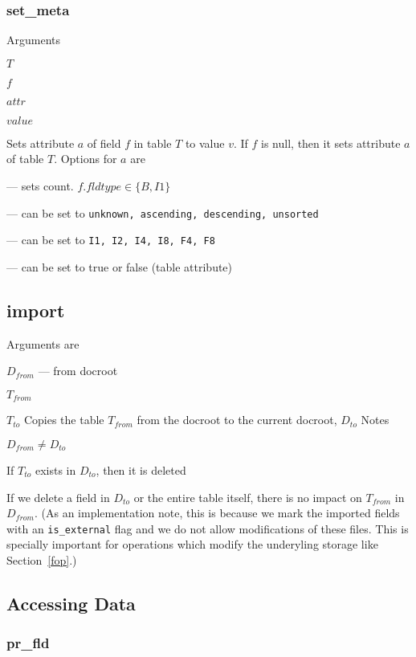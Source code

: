 \subsubsection{set\_meta}
\label{set_meta}
Arguments
\be
\item \(T\) 
\item \(f\) 
\item \(attr\) 
\item \(value\) 
\ee

Sets attribute \(a\) of field \(f\) in table \(T\) to value \(v\). If
\(f\) is null, then it sets attribute \(a\) of table \(T\).
Options for \(a\) are
\bd
\item [cnt] --- sets count. \(f.fldtype \in\{B, I1\}\)
\item [srttype] --- can be set to {\tt unknown, ascending, descending,
  unsorted}
\item [fldtype] --- can be set to {\tt I1, I2, I4, I8, F4, F8}
\item [is\_dict\_tbl] --- can be set to true or false (table attribute)
\ed

\subsection{import}
\label{import}
Arguments are
\be
\item \(D_{from}\) --- from docroot 
\item \(T_{from}\)
\item \(T_{to}\)
\ee
Copies the table \(T_{from}\) from the docroot to the current docroot,
       \(D_{to}\)
Notes
\be
\item \(D_{from} \neq D_{to}\)
\item If \(T_{to}\) exists in \(D_{to}\), then it is deleted
\item If we delete a field in \(D_{to}\) or the entire table itself,
there is no impact on \(T_{from}\) in \(D_{from}\). (As an
  implementation note, this is because we mark the imported fields with
  an \verb+is_external+ flag and we do not allow modifications of these
  files. This is specially important for operations which modify the
  underyling storage like Section~\ref{fop}.)
\ee

\subsection{Accessing Data}
\subsubsection{pr\_fld}

